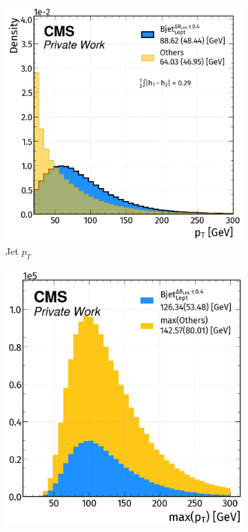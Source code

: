 \begin{figure}[H]
    \vspace{-0.5cm}
    \centering
    \begin{subfigure}{0.513\linewidth}
        \centering
        \includegraphics[width=1\linewidth]{fig//chap08-kin_reco/Jet_pt.png}
        \caption{Jet $p_T$}
    \end{subfigure}
    \hfill
    \begin{subfigure}{0.47\linewidth}  
        \centering
        \includegraphics[width=1\linewidth]{fig//chap08-kin_reco/max_Pt.png}

\end{subfigure}
\end{figure}
